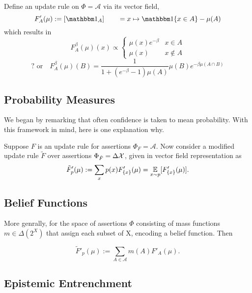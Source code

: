 \documentclass{article}
\begin{document}
\subsection{}

Define an update rule on $\Phi = \mathcal A$ via its vector field,
\[
    F'_A(\mu) := [ \mathbbm 1_{A} ]
     \qquad = x \mapsto \mathbbm1\{x \in A\} - \mu(A)
\]
which results in
\[
    F_A^\beta(\mu)(x) \propto
    \begin{cases}
        \mu(x) e^{-\beta} & x \in A \\
        \mu(x) & x \notin A
    \end{cases}
\]
\[\text{? or}\quad
    F_A^\beta(\mu) (B) =
    \frac{1}{1 + (e^{-\beta}-1) \mu(A) } \mu(B) e^{-\beta \mu(A \cap B)}
\]

\subsection{Probability Measures}

We began by remarking that often confidence is taken to mean probability.
With this framework in mind, here is one explanation why.

Suppose $F$ is an update rule for assertions $\Phi_F = \mathcal A$.
Now consider a modified update rule $\tilde F$ over assertions $\Phi_{\tilde F} = \Delta\mathcal X$, given in vector field representation as
\[
    \tilde F'_p(\mu) := \sum_{x} p(x) F'_{\{x\}}(\mu)
    = \operatorname*{\mathbb{E}}_{x \sim p} [ F'_{\{x\}} (\mu) ].
\]

\subsection{Belief Functions}
More genrally, for the space of assertions $\Phi$ consisting of mass functions $m \in \Delta(2^X)$ that assign each subset of X, encoding a belief function. Then

\[
    \tilde F'_p(\mu) := \sum_{A \in \mathcal A} m(A) F'_{A}(\mu).
\]




\subsection{Epistemic Entrenchment}
\end{document}
